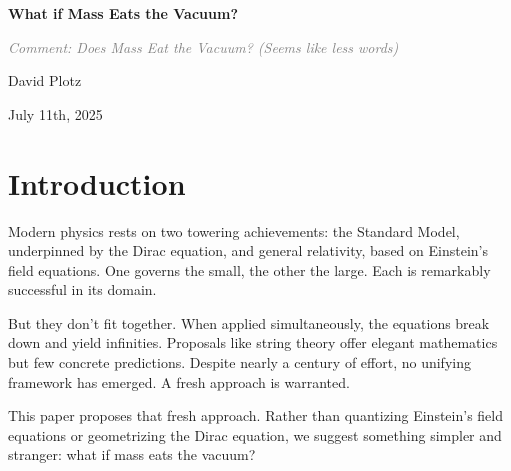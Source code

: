 \documentclass {article}
\newcommand{\comment}[1]{\textcolor{gray}{\small\textit{Comment: #1}}}
\begin{document}
\thispagestyle{empty}%

\begin{center}\strut
	\bfseries\Huge
	What if  Mass Eats the Vacuum? 

\end{center}

	\comment{Does Mass Eat the Vacuum? (Seems like less words)}

\centerline{David Plotz}


\begin{center}\strut
July 11th, 2025
\end{center}
\vfill

	
\newpage
\begin{abstract}
	This paper introduces a classical field theory of gravity built on the Maxwell equations and a central physical hypothesis: that mass absorbs zero-point radiation, inducing a net inward momentum flow. Drawing from stochastic electrodynamics (SED), we assume a Lorentz-invariant radiation field present throughout space and hypothesize that mass acts as a sink for this field.  We construct a consistent model of a massive particle, demonstrate energy and momentum conservation, and show that classical tests of general relativity, inlcuding Mercury's precession, gravitational lensing, and gravitational redshift, are reproduced to leading order. This approach provides a novel, Lorentz-invariant, classical alternative to general relativity, and lays a foundation for further exploration.
\end{abstract}
\newpage

\section{Introduction}

 Modern physics rests on two towering achievements: the Standard Model, underpinned by the Dirac equation, and general relativity, based on Einstein’s field equations. One governs the small, the other the large. Each is remarkably successful in its domain.

But they don’t fit together. When applied simultaneously, the equations break down and yield infinities.  Proposals like string theory offer elegant mathematics but few concrete predictions. Despite nearly a century of effort, no unifying framework has emerged. A fresh approach is warranted.

This paper proposes that fresh approach. Rather than quantizing Einstein’s field equations or geometrizing the Dirac equation, we suggest something simpler and stranger: what if mass eats the vacuum?
\end{document}
